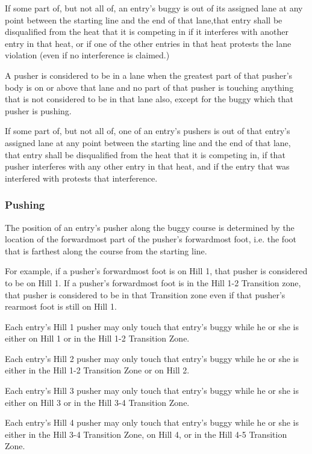 If some part of, but not all of, an entry's buggy is out of its assigned lane at any point between the starting line and the end of that lane,that entry shall be disqualified from the heat that it is competing in if it interferes with another entry in that heat, or if one of the other entries in that heat protests the lane violation (even if no interference is claimed.)

A pusher is considered to be in a lane when the greatest part of that pusher's body is on or above that lane and no part of that pusher is touching anything that is not considered to be in that lane also, except for the buggy which that pusher is pushing.

If some part of, but not all of, one of an entry's pushers is out of that entry's assigned lane at any point between the starting line and the end of that lane, that entry shall be disqualified from the heat that it is competing in, if that pusher interferes with any other entry in that heat, and if the entry that was interfered with protests that interference.

\subsubsection{Pushing}

The position of an entry's pusher along the buggy course is determined by the location of the forwardmost part of the pusher's forwardmost foot, i.e. the foot that is farthest along the course from the starting line.

For example, if a pusher's forwardmost foot is on Hill 1, that pusher is considered to be on Hill 1. If a pusher's forwardmost foot is in the Hill 1-2 Transition zone, that pusher is considered to be in that Transition zone even if that pusher's rearmost foot is still on Hill 1.

Each entry's Hill 1 pusher may only touch that entry's buggy while he or she is either on Hill 1 or in the Hill 1-2 Transition Zone.

Each entry's Hill 2 pusher may only touch that entry's buggy while he or she is either in the Hill 1-2 Transition Zone or on Hill 2.

Each entry's Hill 3 pusher may only touch that entry's buggy while he or she is either on Hill 3 or in the Hill 3-4 Transition Zone.

Each entry's Hill 4 pusher may only touch that entry's buggy while he or she is either in the Hill 3-4 Transition Zone, on Hill 4, or in the Hill 4-5 Transition Zone.

